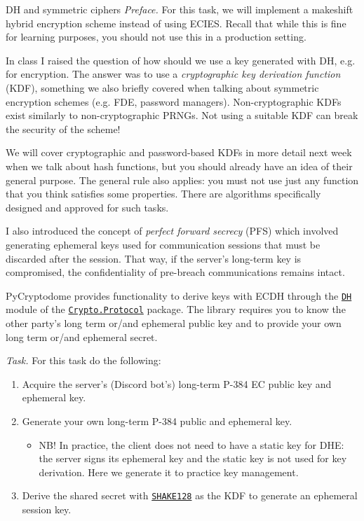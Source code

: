 \documentclass{practice}
\begin{document}
\begin{task}{DH and symmetric ciphers}
  \textit{Preface.}
  For this task, we will implement a makeshift hybrid encryption scheme instead of using ECIES.
  Recall that while this is fine for learning purposes, you should not use this in a production setting.

  In class I raised the question of how should we use a key generated with DH, e.g. for encryption.
  The answer was to use a \emph{cryptographic key derivation function} (KDF), something we also briefly covered when talking about symmetric encryption schemes (e.g. FDE, password managers).
  Non-cryptographic KDFs exist similarly to non-cryptographic PRNGs.
  Not using a suitable KDF can break the security of the scheme!

  We will cover cryptographic and password-based KDFs in more detail next week when we talk about hash functions, but you should already have an idea of their general purpose.
  The general rule also applies: you must not use just any function that you think satisfies some properties.
  There are algorithms specifically designed and approved for such tasks.

  I also introduced the concept of \emph{perfect forward secrecy} (PFS) which involved generating ephemeral keys used for communication sessions that must be discarded after the session.
  That way, if the server's long-term key is compromised, the confidentiality of pre-breach communications remains intact.

  PyCryptodome provides functionality to derive keys with ECDH through the \href{https://pycryptodome.readthedocs.io/en/latest/src/protocol/dh.html}{\texttt{DH}} module of the \href{https://pycryptodome.readthedocs.io/en/latest/src/protocol/protocol.html}{\texttt{Crypto.Protocol}} package.
  The library requires you to know the other party's long term or/and ephemeral public key and to provide your own long term or/and ephemeral secret.

  \textit{Task.}
  For this task do the following:
  \begin{enumerate}
    \item Acquire the server's (Discord bot's) long-term P-384 EC public key and ephemeral key.
    \item Generate your own long-term P-384 public and ephemeral key.
    \begin{itemize}
      \item NB! In practice, the client does not need to have a static key for DHE: the server signs its ephemeral key and the static key is not used for key derivation.
      Here we generate it to practice key management.
    \end{itemize}
    \item Derive the shared secret with \href{https://pycryptodome.readthedocs.io/en/latest/src/hash/shake128.html#shake128}{\texttt{SHAKE128}} as the KDF to generate an ephemeral session key.
    

\end{enumerate}
\end{task}
\end{document}
